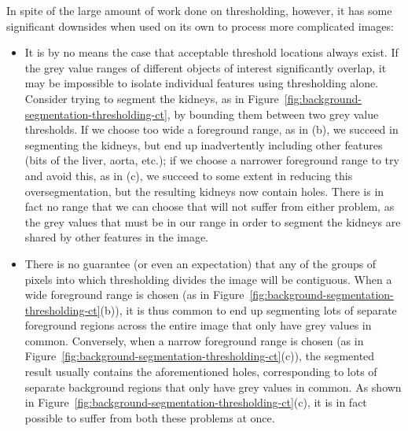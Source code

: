 \noindent In spite of the large amount of work done on thresholding, however, it has some significant downsides when used on its own to process more complicated images:

\begin{itemize}

\item It is by no means the case that acceptable threshold locations always exist. If the grey value ranges of different objects of interest significantly overlap, it may be impossible to isolate individual features using thresholding alone. Consider trying to segment the kidneys, as in Figure~\ref{fig:background-segmentation-thresholding-ct}, by bounding them between two grey value thresholds. If we choose too wide a foreground range, as in (b), we succeed in segmenting the kidneys, but end up inadvertently including other features (bits of the liver, aorta, etc.); if we choose a narrower foreground range to try and avoid this, as in (c), we succeed to some extent in reducing this oversegmentation, but the resulting kidneys now contain holes. There is in fact no range that we can choose that will not suffer from either problem, as the grey values that must be in our range in order to segment the kidneys are shared by other features in the image.

\item There is no guarantee (or even an expectation) that any of the groups of pixels into which thresholding divides the image will be contiguous. When a wide foreground range is chosen (as in Figure~\ref{fig:background-segmentation-thresholding-ct}(b)), it is thus common to end up segmenting lots of separate foreground regions across the entire image that only have grey values in common. Conversely, when a narrow foreground range is chosen (as in Figure~\ref{fig:background-segmentation-thresholding-ct}(c)), the segmented result usually contains the aforementioned holes, corresponding to lots of separate background regions that only have grey values in common. As shown in Figure~\ref{fig:background-segmentation-thresholding-ct}(c), it is in fact possible to suffer from both these problems at once.

\end{itemize}

